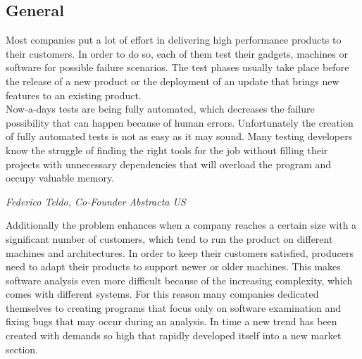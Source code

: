 \subsection{General}
Most companies put a lot of effort in delivering high performance products to their customers. In order to do so, each of them test their gadgets, machines or software for possible failure scenarios. The test phases usually take place before the release of a new product or the deployment of an update that brings new features to an existing product.\\
Now-a-days tests are being fully automated, which decreases the failure possibility that can happen because of human errors\cite{8389562}. Unfortunately the creation of fully automated tests is not as easy as it may sound. Many testing developers know the struggle of finding the right tools for the job without filling their projects with unnecessary dependencies that will overload the program and occupy valuable memory.
\begin{center}
	\begin{flushright}
		\textit{Federico Teldo, Co-Founder Abstracta US}
	\end{flushright}
\end{center}
Additionally the problem enhances when a company reaches a certain size with a significant number of customers, which tend to run the product on different machines and architectures. In order to keep their customers satisfied, producers need to adapt their products to support newer or older machines. This makes software analysis even more difficult because of the increasing complexity, which comes with different systems. For this reason many companies dedicated themselves to creating programs that focus only on software examination and fixing bugs that may occur during an analysis. In time a new trend has been created with demands so high that rapidly developed itself into a new market section.\\
